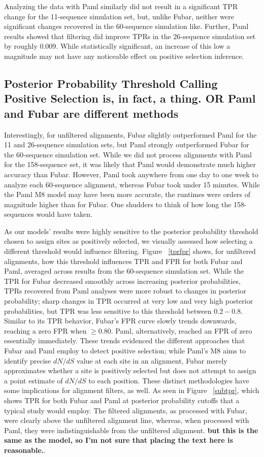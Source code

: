 \documentclass[10pt]{article}
\begin{document}
Analyzing the data with Paml similarly did not result in a significant TPR change for the 11-sequence simulation set, but, unlike Fubar, neither were significant changes recovered in the 60-sequence simulation like. Further, Paml results showed that filtering did improve TPRs in the 26-sequence simulation set by roughly 0.009. While statistically significant, an increase of this low a magnitude may not have any noticeable effect on positive selection inference. 

\subsection*{Posterior Probability Threshold Calling Positive Selection is, in fact, a thing. OR Paml and Fubar are different methods}

Interestingly, for unfiltered alignments, Fubar slightly outperformed Paml for the 11 and 26-sequence simulation sets, but Paml strongly outperformed Fubar for the 60-sequence simulation set. While we did not process alignments with Paml for the 158-sequence set, it was likely that Paml would demonstrate much higher accuracy than Fubar. However, Paml took anywhere from one day to one week to analyze each 60-sequence alignment, whereas Fubar took under 15 minutes. While the Paml M8 model may have been more accurate, the runtimes were orders of magnitude higher than for Fubar. One shudders to think of how long the 158-sequences would have taken.


As our models' results were highly sensitive to the posterior probability threshold chosen to assign sites as positively selected, we visually assessed how selecting a different threshold would influence filtering. Figure ~\ref{tprfpr} shows, for unfiltered alignments, how this threshold influences TPR and FPR for both Fubar and Paml, averaged across results from the 60-sequence simulation set. While the TPR for Fubar decreased smoothly across increasing posterior probabilities, TPRs recovered from Paml analyses were more robust to changes in posterior probability; sharp changes in TPR occurred at very low and very high posterior probabilities, but TPR was less sensitive to this threshold between $0.2-0.8$. Similar to its TPR behavior, Fubar's FPR curve slowly trends downwards, reaching a zero FPR when $\geq0.80$. Paml, alternatively, reached an FPR of zero essentially immediately. These trends evidenced the different approaches that Fubar and Paml employ to detect positive selection; 
while Paml's M8 aims to identify precise $dN/dS$ value at each site in an alignment, Fubar merely approximates whether a site is positively selected but does not attempt to assign a point estimate of $dN/dS$ to each position. 
These distinct methodologies have some implications for alignment filters, as well. As seen in Figure ~\ref{subtpr}, which shows TPR for both Fubar and Paml at posterior probability cutoffs that a typical study would employ. The filtered alignments, as processed with Fubar, were clearly above the unfiltered alignment line, whereas, when processed with Paml, they were indistinguishable from the unfiltered alignment. \textbf{but this is the same as the model, so I'm not sure that placing the text here is reasonable.}.
\end{document}
